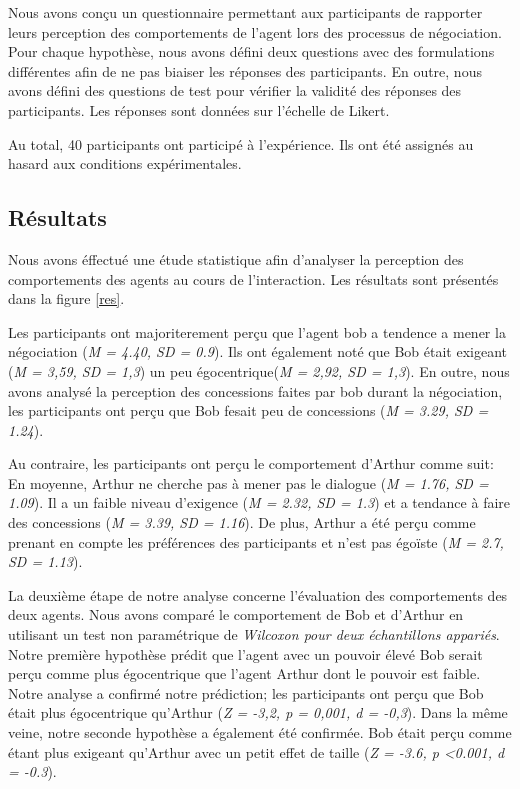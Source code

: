 \documentclass [french]{sig-alternate-05-2015}
\begin{document}
{			Nous avons conçu un questionnaire permettant aux participants de rapporter leurs perception des comportements de l'agent lors des processus de négociation. Pour chaque hypothèse, nous avons défini deux questions avec des formulations différentes afin de ne pas biaiser les réponses des participants. En outre, nous avons défini des questions de test pour vérifier la validité des réponses des participants. Les réponses sont données sur l'échelle de Likert.
			
			Au total, 40 participants ont participé à l'expérience. Ils ont été assignés au hasard aux conditions expérimentales.
			
			\subsection{Résultats}
				Nous avons éffectué une étude statistique afin d'analyser la perception des comportements des agents au cours de l'interaction. Les résultats sont présentés dans la figure \ref{res}.
				
				Les participants ont majoriterement perçu que l'agent bob a tendence a mener la négociation (\emph {M = 4.40, SD = 0.9}). Ils ont également noté que Bob était exigeant (\emph {M = 3,59, SD = 1,3}) un peu égocentrique(\emph {M = 2,92, SD = 1,3}). En outre, nous avons analysé la perception des concessions faites par bob durant la négociation, les participants ont perçu que Bob fesait peu de concessions (\emph {M = 3.29, SD = 1.24}).
				
				Au contraire, les participants ont perçu le comportement d'Arthur comme suit: En moyenne, Arthur ne cherche pas à mener pas le dialogue (\emph {M = 1.76, SD = 1.09}). Il a un faible niveau d'exigence (\emph {M = 2.32, SD = 1.3}) et a tendance à faire des concessions (\emph {M = 3.39, SD = 1.16}). De plus, Arthur a été perçu comme prenant en compte les préférences des participants et n'est pas égoïste (\emph {M = 2.7, SD = 1.13}).
				
				La deuxième étape de notre analyse concerne l'évaluation des comportements des deux agents. Nous avons comparé le comportement de Bob et d'Arthur en utilisant un test non paramétrique de \emph{ Wilcoxon pour deux échantillons appariés}. Notre première hypothèse prédit que l'agent avec un pouvoir élevé Bob serait perçu comme plus égocentrique que l'agent Arthur dont le pouvoir est faible. Notre analyse a confirmé notre prédiction; les participants ont perçu que Bob était plus égocentrique qu'Arthur (\emph {Z = -3,2, p = 0,001, d = -0,3}). Dans la même veine, notre seconde hypothèse a également été confirmée. Bob était perçu comme étant plus exigeant qu'Arthur avec un petit effet de taille (\emph {Z = -3.6, p <0.001, d = -0.3}).
				
}
\end{document}
